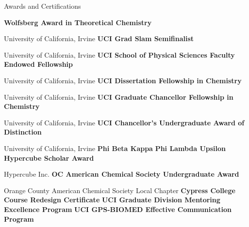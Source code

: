 \begin{rubric}{Awards and Certifications}

  
  \entry*[June 2022] \textbf{Wolfsberg Award in Theoretical Chemistry}
  
  University of California, Irvine
  \entry*[Feb 2022] \textbf{UCI Grad Slam Semifinalist}
  
  University of California, Irvine
  \entry*[Jun 2021] \textbf{UCI School of Physical Sciences Faculty Endowed Fellowship}

  University of California, Irvine
  \entry*[Jun 2021] \textbf{UCI Dissertation Fellowship in Chemistry}
  
  University of California, Irvine
  \entry*[Sept 2016] \textbf{UCI Graduate Chancellor Fellowship in Chemistry}
  
  University of California, Irvine
  \entry*[Jun 2015] \textbf{UCI Chancellor's Undergraduate Award of Distinction}
  
  University of California, Irvine
  \entry*[May 2015] \textbf{Phi Beta Kappa}
  \entry*[May 2015] \textbf{Phi Lambda Upsilon}
  \entry*[Jun 2014] \textbf{Hypercube Scholar Award}
  
  Hypercube Inc.
  \entry*[Apr 2014] \textbf{OC American Chemical Society Undergraduate Award}
  
  Orange County American Chemical Society Local Chapter
  \entry*[Feb 2023] \textbf{Cypress College Course Redesign Certificate}
  \entry*[Mar 2020] \textbf{UCI Graduate Division Mentoring Excellence Program}
  \entry*[Jun 2017] \textbf{UCI GPS-BIOMED Effective Communication Program} 
\end{rubric}
